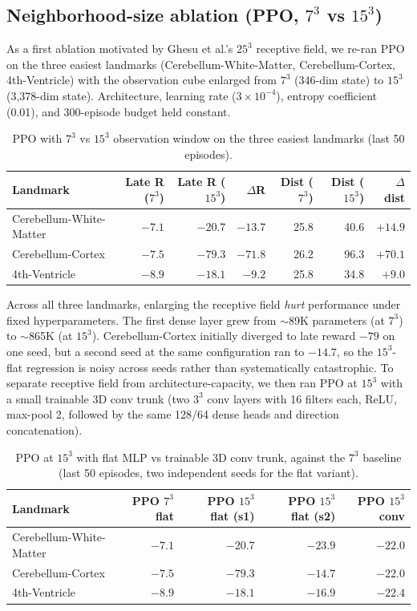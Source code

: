 \documentclass[11pt]{article}
\begin{document}
\subsection*{Neighborhood-size ablation (PPO, $7^3$ vs $15^3$)}

As a first ablation motivated by Ghesu et al.'s $25^3$ receptive field, we re-ran PPO on the three easiest landmarks (Cerebellum-White-Matter, Cerebellum-Cortex, 4th-Ventricle) with the observation cube enlarged from $7^3$ (346-dim state) to $15^3$ (3{,}378-dim state). Architecture, learning rate ($3 \times 10^{-4}$), entropy coefficient (0.01), and 300-episode budget held constant.

\begin{table}[H]
\centering
\footnotesize
\caption{PPO with $7^3$ vs $15^3$ observation window on the three easiest landmarks (last 50 episodes).}
\label{tab:neighborhood}
\begin{tabular}{lrrrrrr}
\toprule
Landmark & Late R ($7^3$) & Late R ($15^3$) & $\Delta$R & Dist ($7^3$) & Dist ($15^3$) & $\Delta$dist \\
\midrule
Cerebellum-White-Matter & $-7.1$ & $-20.7$ & $-13.7$ & 25.8 & 40.6 & $+14.9$ \\
Cerebellum-Cortex       & $-7.5$ & $-79.3$ & $-71.8$ & 26.2 & 96.3 & $+70.1$ \\
4th-Ventricle           & $-8.9$ & $-18.1$ &  $-9.2$ & 25.8 & 34.8 &  $+9.0$ \\
\bottomrule
\end{tabular}
\end{table}

Across all three landmarks, enlarging the receptive field \emph{hurt} performance under fixed hyperparameters. The first dense layer grew from $\sim$89K parameters (at $7^3$) to $\sim$865K (at $15^3$). Cerebellum-Cortex initially diverged to late reward $-79$ on one seed, but a second seed at the same configuration ran to $-14.7$, so the $15^3$-flat regression is noisy across seeds rather than systematically catastrophic. To separate receptive field from architecture-capacity, we then ran PPO at $15^3$ with a small trainable 3D conv trunk (two $3^3$ conv layers with 16 filters each, ReLU, max-pool 2, followed by the same 128/64 dense heads and direction concatenation).

\begin{table}[H]
\centering
\footnotesize
\caption{PPO at $15^3$ with flat MLP vs trainable 3D conv trunk, against the $7^3$ baseline (last 50 episodes, two independent seeds for the flat variant).}
\label{tab:conv-trunk}
\begin{tabular}{lrrrr}
\toprule
Landmark & PPO $7^3$ flat & PPO $15^3$ flat (s1) & PPO $15^3$ flat (s2) & PPO $15^3$ conv \\
\midrule
Cerebellum-White-Matter & $-7.1$ & $-20.7$ & $-23.9$ & $-22.0$ \\
Cerebellum-Cortex       & $-7.5$ & $-79.3$ & $-14.7$ & $-22.0$ \\
4th-Ventricle           & $-8.9$ & $-18.1$ & $-16.9$ & $-22.4$ \\
\bottomrule
\end{tabular}
\end{table}
\end{document}
